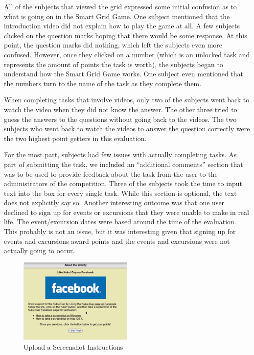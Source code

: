 All of the subjects that viewed the grid expressed some initial confusion as to what is going on in the Smart Grid Game. One subject mentioned that the introduction video did not explain how to play the game at all. A few subjects clicked on the question marks hoping that there would be some response. At this point, the question marks did nothing, which left the subjects even more confused. However, once they clicked on a number (which is an unlocked task and represents the amount of points the task is worth), the subjects began to understand how the Smart Grid Game works. One subject even mentioned that the numbers turn to the name of the task as they complete them.

When completing tasks that involve videos, only two of the subjects went back to watch the video when they did not know the answer. The other three tried to guess the answers to the questions without going back to the videos. The two subjects who went back to watch the videos to answer the question correctly were the two highest point getters in this evaluation.

For the most part, subjects had few issues with actually completing tasks. As part of submitting the task, we included an ``additional comments'' section that was to be used to provide feedback about the task from the user to the administrators of the competition. Three of the subjects took the time to input text into the box for every single task. While this section is optional, the text does not explicitly say so. Another interesting outcome was that one user declined to sign up for events or excursions that they were unable to make in real life. The event/excursion dates were based around the time of the evaluation. This probably is not an issue, but it was interesting given that signing up for events and excursions award points and the events and excursions were not actually going to occur.

\begin{figure}[t]
    \center
    \includegraphics[width=0.5\textwidth]{images/april-screenshot-upload.eps}
    \caption{Upload a Screenshot Instructions}
    \label{fig:april-screenshot-upload}
\end{figure}

